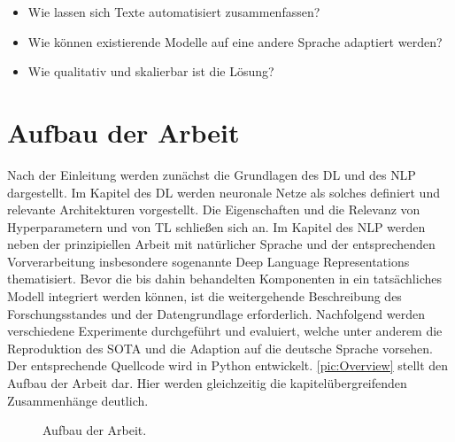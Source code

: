 \begin{itemize}
	\item Wie lassen sich Texte automatisiert zusammenfassen?
	\item Wie können existierende Modelle auf eine andere Sprache adaptiert werden?
	\item Wie qualitativ und skalierbar ist die Lösung?
\end{itemize}


\section{Aufbau der Arbeit}
\noindent
Nach der Einleitung werden zunächst die Grundlagen des \ac{DL} und des \ac{NLP} dargestellt. Im Kapitel des \ac{DL} werden neuronale Netze als solches definiert und relevante Architekturen vorgestellt. Die Eigenschaften und die Relevanz von Hyperparametern und von \ac{TL} schließen sich an. Im Kapitel des \ac{NLP} werden neben der prinzipiellen Arbeit mit natürlicher Sprache und der entsprechenden Vorverarbeitung insbesondere sogenannte Deep Language Representations thematisiert. Bevor die bis dahin behandelten Komponenten in ein tatsächliches Modell integriert werden können, ist die weitergehende Beschreibung des Forschungsstandes und der Datengrundlage erforderlich. Nachfolgend werden verschiedene Experimente durchgeführt und evaluiert, welche unter anderem die Reproduktion des \ac{SOTA} und die Adaption auf die deutsche Sprache vorsehen. Der entsprechende Quellcode wird in Python entwickelt. \autoref{pic:Overview} stellt den Aufbau der Arbeit dar. Hier werden gleichzeitig die kapitelübergreifenden Zusammenhänge deutlich.
\newpage

\begin{figure}[h]
  \centering
  \caption{Aufbau der Arbeit.}
  \label{pic:Overview}
\end{figure}


